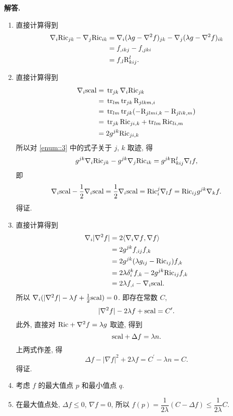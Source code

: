 \documentclass{ctexart}
\newenvironment{solution}{\par\noindent\textbf{解答. }}{\par}
\begin{document}
\begin{solution}
    \begin{enumerate}
        \item\label{enum::3} 直接计算得到
        \[
            \begin{aligned}
                \nabla_{i}\mathrm{Ric}_{jk} - \nabla_{j}\mathrm{Ric}_{ik} ={} & \nabla_{i}(\lambda g - \nabla^2 f)_{jk} - \nabla_{j}(\lambda g - \nabla^2 f)_{ik} \\
                ={} & f_{,ikj} - f_{,jki} \\
                ={} & f_{,l}\mathrm{R}^{l}_{kij}.
            \end{aligned}
        \]
        \item 直接计算得到
        \[
            \begin{aligned}
                \nabla_{i}\mathrm{scal} ={} & \operatorname{tr}_{jk}\nabla_{i}\mathrm{Ric}_{jk} \\
                ={} & \operatorname{tr}_{lm} \operatorname{tr}_{jk} \mathrm{R}_{jlkm, i} \\
                ={} & \operatorname{tr}_{lm} \operatorname{tr}_{jk} (-\mathrm{R}_{jlmi, k} - \mathrm{R}_{jlik, m}) \\
                ={} & \operatorname{tr}_{jk}\mathrm{Ric}_{ji, k} + \operatorname{tr}_{lm} \mathrm{Ric}_{li, m} \\
                ={} & 2g^{jk}\mathrm{Ric}_{ji, k}
            \end{aligned}
        \]
        所以对 \ref{enum::3} 中的式子关于 $j$, $k$ 取迹, 得
        \[
            g^{jk}\nabla_{i}\mathrm{Ric}_{jk} - g^{jk}\nabla_{j}\mathrm{Ric}_{ik} = g^{jk}\mathrm{R}^{l}_{kij}\nabla_{l}f,
        \]
        即
        \[
            \nabla_{i}\mathrm{scal} - \dfrac{1}{2}\nabla_{i}\mathrm{scal} = \dfrac{1}{2}\nabla_{i}\mathrm{scal} = \mathrm{Ric}^{j}_{i}\nabla_{l}f = \mathrm{Ric}_{ij}g^{jk}\nabla_{k}f.
        \]
        得证.
        \item 直接计算得到
        \[
            \begin{aligned}
                \nabla_{i}|\nabla^2 f| ={} & 2\langle {\nabla_{i}\nabla f}, {\nabla f} \rangle \\
                ={} & 2g^{jk} f_{,ij} f_{,k} \\
                ={} & 2g^{jk} (\lambda g_{ij} - \mathrm{Ric}_{ij}) f_{,k} \\
                ={} & 2\lambda \delta^{k}_{i}f_{, k} - 2g^{jk}\mathrm{Ric}_{ij}f_{,k} \\
                ={} & 2\lambda f_{, i} - \nabla_{i}\mathrm{scal}.
            \end{aligned}
        \]
        所以 $\nabla_{i}(|\nabla^2 f| - \lambda f + \frac{1}{2}\mathrm{scal}) = 0$. 即存在常数 $C$,
        \[
            |\nabla^2 f| - 2\lambda f + \mathrm{scal} = C^\prime.
        \]
        此外, 直接对 $\mathrm{Ric} + \nabla^2 f = \lambda g$ 取迹, 得到
        \[
            \mathrm{scal} + \Delta f = \lambda n.
        \]
        上两式作差, 得
        \[
            \Delta f - |\nabla f |^2 + 2 \lambda f = C^\prime - \lambda n = C.
        \]
        得证.
        \item 考虑 $f$ 的最大值点 $p$ 和最小值点 $q$.
        \item 
        在最大值点处, $\Delta f \leqslant 0$, $\nabla f = 0$, 所以 $f(p) = \dfrac{1}{2\lambda}(C - \Delta f) \leqslant \dfrac{1}{2\lambda}C$.\


\end{enumerate}
\end{solution}
\end{document}
